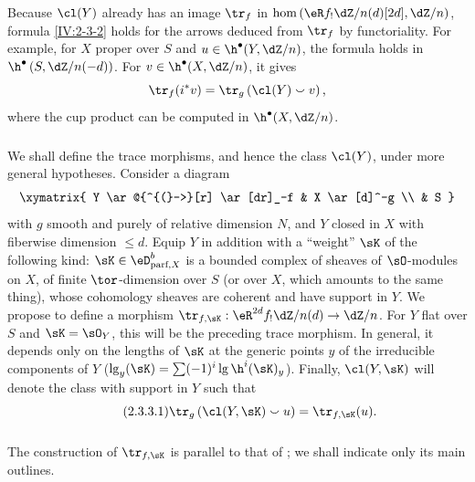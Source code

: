 \documentclass[oneside]{book}
\begin{document}
Because $\cl(Y)$ already has an image $\tr_f$ in
$\hom\left(\eR f_!\dZ/n(d)[2 d],\dZ/n\right)$, formula
\ref{IV:2-3-2} holds for the arrows deduced from $\tr_f$ by functoriality.
For example, for $X$ proper over $S$ and
$u\in \h^\bullet(Y,\dZ/n)$, the formula holds in
$\h^\bullet\left(S,\dZ/n(-d)\right)$. For
$v\in \h^\bullet(X,\dZ/n)$, it gives
\[
  \tr_f(i^* v) = \tr_g\left(\cl(Y)\smallsmile v\right) \text{,}
\]
where the cup product can be computed in $\h^\bullet(X,\dZ/n)$.






\subsubsection{}\label{IV:2-3-3}

We shall define the trace morphisms, and hence the class $\cl(Y)$, under more
general hypotheses. Consider a diagram
\[\xymatrix{
  Y \ar@{^{(}->}[r] \ar[dr]_-f
    & X \ar[d]^-g \\
  & S
}\]
with $g$ smooth and purely of relative dimension $N$, and $Y$ closed in $X$
with fiberwise dimension $\leqslant d$. Equip $Y$ in addition with a
``weight'' $\sK$ of the following kind:
$\sK\in\eD_{\text{parf},X}^b$ is a bounded complex of sheaves of
$\sO$-modules on $X$, of finite $\tor$-dimension over $S$ (or over $X$,
which amounts to the same thing), whose cohomology sheaves are coherent and
have support in $Y$. We propose to define a morphism
$\tr_{f,\sK}:\eR^{2 d}f_! \dZ/n(d) \to \dZ/n$. For $Y$ flat over $S$ and
$\sK=\sO_Y$, this will be the preceding trace morphism. In general, it
depends only on the lengths of $\sK$ at the generic points $y$ of the
irreducible components of
$Y$ ($\operatorname{lg}_y(\sK) = \sum (-1)^i \operatorname{lg} \h^i(\sK)_y$).
Finally, $\cl(Y,\sK)$ will denote the class with support in $Y$ such that
\begin{equation*}\tag{2.3.3.1}\label{IV:eq:2-3-3-1}
  \tr_g\left(\cl(Y,\sK)\smallsmile u\right) = \tr_{f,\sK}(u) \text{.}
\end{equation*}






\subsubsection{}\label{IV:2-3-4}

The construction of $\tr_{f,\sK}$ is parallel to that of
\cite[XVIII.2]{sga4}; we shall indicate only its main outlines.
\end{document}
